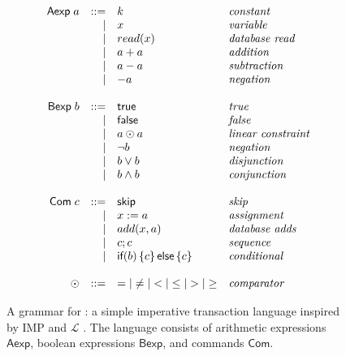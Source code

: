 \newcommand{\aexp}{\textsf{Aexp}}
\newcommand{\bexp}{\textsf{Bexp}}
\newcommand{\com}{\textsf{Com}}
\newcommand{\impskip}{\textsf{skip}}
\newcommand{\impif}[3]{\textsf{if}(#1)\set{#2}\textsf{else}\set{#3}}
\begin{figure}[h]
  \centering
  \begin{gather*}
    \begin{array}{rrll}
      \aexp\; a & ::= & k       & \text{\emph{constant}} \\
                & |   & x       & \text{\emph{variable}} \\
                & |   & read(x) & \text{\emph{database read}} \\
                & |   & a + a   & \text{\emph{addition}} \\
                & |   & a - a   & \text{\emph{subtraction}} \\
                & |   & - a     & \text{\emph{negation}} \\
      &&& \\
      \bexp\; b & ::= & \textsf{true}  & \text{\emph{true}} \\
                & |   & \textsf{false} & \text{\emph{false}} \\
                & |   & a \odot a      & \text{\emph{linear constraint}} \\
                & |   & \lnot b        & \text{\emph{negation}} \\
                & |   & b \lor b       & \text{\emph{disjunction}} \\
                & |   & b \land b      & \text{\emph{conjunction}} \\
      &&& \\
      \com\; c  & ::= & \impskip        & \text{\emph{skip}} \\
                & |   & x := a          & \text{\emph{assignment}} \\
                & |   & add(x, a)       & \text{\emph{database adds}} \\
                & |   & c; c            & \text{\emph{sequence}} \\
                & |   & \impif{b}{c}{c} & \text{\emph{conditional}} \\
      &&& \\
      \odot & ::= & =    \vert
                    \neq \vert
                    <    \vert
                    \leq \vert
                    >    \vert
                    \geq & \text{\emph{comparator}}
    \end{array}
  \end{gather*}

  \caption{
    A grammar for \imp{}: a simple imperative transaction language inspired by
    IMP \cite{winskel1993formal} and $\mathcal{L}$ \cite{roy2015homeostasis}.
    The language consists of arithmetic expressions $\aexp{}$, boolean
    expressions $\bexp{}$, and commands $\com{}$.
  }
  \label{fig:imp-grammar}
\end{figure}

